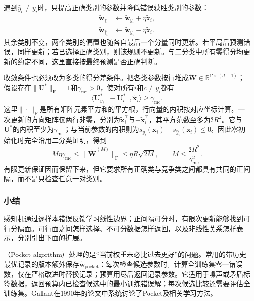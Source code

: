 遇到$\hat y_i\ne y_i$时，只提高正确类别的参数并降低错误获胜类别的参数：
\begin{equation}
  \label{eq:classification-perceptron-multiclass-update}
  \begin{aligned}
    \tilde{\bm{w}}_{y_i}
      &\leftarrow\tilde{\bm{w}}_{y_i}+\eta\tilde{\bm{x}}_i,\\
    \tilde{\bm{w}}_{\hat y_i}
      &\leftarrow\tilde{\bm{w}}_{\hat y_i}-\eta\tilde{\bm{x}}_i .
  \end{aligned}
\end{equation}
其余类别不变，两个类别的偏置也随各自最后一个分量同时更新。若平局后预测错误，同样更新；若已选择正确类别，则该规则不更新。与二分类中所有零得分均更新的约定不同，这里直接按最终预测是否正确判断。

收敛条件也必须改为多类的得分差条件。把各类参数按行堆成$\tilde{\bm{W}}\in\mathbb{R}^{C\times(d+1)}$；假设存在$\|\bm{U}^\ast\|_{\mathrm{F}}=1$和$\gamma_{\mathrm{mc}}>0$，使对所有$i$和$c\ne y_i$都有
\[
  \langle\bm{U}_{y_i,:}^\ast-\bm{U}_{c,:}^\ast,
    \tilde{\bm{x}}_i\rangle\geq\gamma_{\mathrm{mc}} .
\]
这里$\|\cdot\|_{\mathrm{F}}$是所有矩阵元素平方和的平方根，行向量的内积按对应坐标计算。一次更新的方向矩阵仅两行非零，分别为$\tilde{\bm{x}}_i^{\top}$与$-\tilde{\bm{x}}_i^{\top}$，其平方范数至多为$2R^2$。它与$\bm{U}^\ast$的内积至少为$\gamma_{\mathrm{mc}}$；与当前参数的内积则为$s_{y_i}(\bm{x}_i)-s_{\hat y_i}(\bm{x}_i)\leq0$。因此零初始化时完全沿用二分类证明，得到
\[
  M\eta\gamma_{\mathrm{mc}}
    \leq\|\tilde{\bm{W}}^{(M)}\|_{\mathrm{F}}
    \leq\eta R\sqrt{2M},
  \qquad
  M\leq\frac{2R^2}{\gamma_{\mathrm{mc}}^2}.
\]
有限更新保证因而保留下来，但它要求所有正确类与竞争类之间都具有共同的正间隔，而不是只检查任意一对类别。

\subsubsection{小结}
\label{sec:classification-perceptron-summary}

感知机通过逐样本错误反馈学习线性边界；正间隔可分时，有限次更新能够找到可行分隔面。可行面之间怎样选择、不可分数据怎样返回，以及非线性关系怎样表示，分别引出下面的扩展。

（Pocket algorithm）处理的是“当前权重未必比过去更好”的问题。常用的带历史最优记录的版本额外保存$\tilde{\bm{w}}_{\mathrm{pocket}}$：每次检查候选参数时，计算全训练集零一错误数，仅在严格改进时替换记录；预算用尽后返回记录参数。它适用于噪声或矛盾标签数据，返回预算内已检查候选中的最小训练错误解；每次候选比较还需要评估全训练集。Gallant在1990年的论文中系统讨论了Pocket及相关学习方法。

